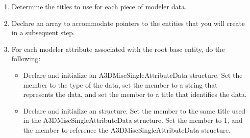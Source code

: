 \documentclass[letterpaper,12pt,english,openany,oneside]{sphinxmanual}
\begin{document}
\begin{enumerate}
%
\setcounter{enumi}{1}
\item {} 
Determine the titles to use for each piece of modeler data.

\item {} 
Declare an array to accommodate pointers to the  entities that you will create in a subsequent step.

\item {} 
For each modeler attribute associated with the root base entity, do the following:
\begin{itemize}
\item {} 
Declare and initialize an A3DMiscSingleAttributeData structure. Set the  member to the type of the data, set the  member to a string that represents the data, and set the  member to a title that identifies the data.

\item {} 
Declare and initialize an  structure. Set the  member to the same title used in the A3DMiscSingleAttributeData structure. Set the  member to 1, and the  member to reference the A3DMiscSingleAttributeData structure.

\end{itemize}

\end{enumerate}
\end{document}
